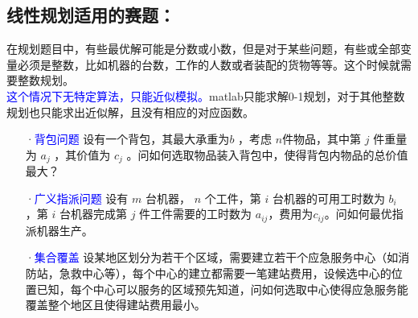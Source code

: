 \documentclass[a4paper,20pt]{article}
\begin{document}
    \subsection{线性规划适用的赛题：}
    在规划题目中，有些最优解可能是分数或小数，但是对于某些问题，有些或全部变量必须是整数，比如机器的台数，工作的人数或者装配的货物等等。这个时候就需要整数规划。
    \\\textcolor{blue}{这个情况下无特定算法，只能近似模拟。}matlab只能求解0-1规划，对于其他整数规划也只能求出近似解，且没有相应的对应函数。
    \begin{itemize}
        \item[·\textcolor{blue}{背包问题}] 设有一个背包，其最大承重为$ b$ ，考虑 $n $件物品，其中第 $j$ 件重量为 $a_j$ ，其价值为 $c_j$ 。问如何选取物品装入背包中，使得背包内物品的总价值最大？
        \item[·\textcolor{blue}{广义指派问题}] 设有 $m$ 台机器， $n$ 个工件，第 $i$ 台机器的可用工时数为 $b_i$ ，第 $i$ 台机器完成第 $j$ 件工件需要的工时数为 $a_{ij} $，费用为$ c_{ij} $。问如何最优指派机器生产。
        \item[·\textcolor{blue}{集合覆盖}] 设某地区划分为若干个区域，需要建立若干个应急服务中心（如消防站，急救中心等），每个中心的建立都需要一笔建站费用，设候选中心的位置已知，每个中心可以服务的区域预先知道，问如何选取中心使得应急服务能覆盖整个地区且使得建站费用最小。
    \end{itemize}
\end{document}
